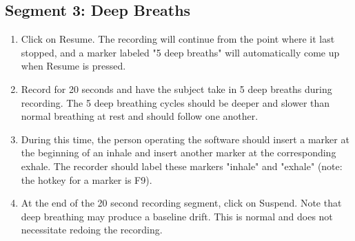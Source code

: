 \documentclass{article}
\begin{document}
\subsection*{Segment 3: Deep Breaths}
\begin{enumerate}
	\item Click on Resume. The recording will continue from the point where it last stopped, and a marker labeled "5 deep breaths" will automatically come up when Resume is pressed.
	\item Record for 20 seconds and have the subject take in 5 deep breaths during recording. The 5 deep breathing cycles should be deeper and slower than normal breathing at rest and should follow one another.
	\item During this time, the person operating the software should insert a marker at the beginning of an inhale and insert another marker at the corresponding exhale. The recorder should label these markers "inhale" and "exhale" (note: the hotkey for a marker is F9).
	\item At the end of the 20 second recording segment, click on Suspend. Note that deep breathing may produce a baseline drift. This is normal and does not necessitate redoing the recording.
\end{enumerate}
\end{document}
